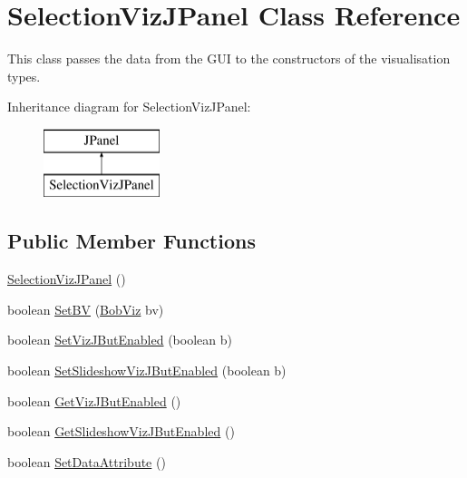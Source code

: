 \hypertarget{class_selection_viz_j_panel}{\section{Selection\-Viz\-J\-Panel Class Reference}
\label{class_selection_viz_j_panel}
}


This class passes the data from the G\-U\-I to the constructors of the visualisation types.  


Inheritance diagram for Selection\-Viz\-J\-Panel\-:\begin{figure}[H]
\begin{center}
\leavevmode
\includegraphics[height=2.000000cm]{class_selection_viz_j_panel}
\end{center}
\end{figure}
\subsection*{Public Member Functions}
\begin{DoxyCompactItemize}
\item 
\hyperlink{class_selection_viz_j_panel_ab3acb1051321159e8cfcc251b6adeb9a}{Selection\-Viz\-J\-Panel} ()
\item 
boolean \hyperlink{class_selection_viz_j_panel_a6287ea60b41d461f06b609340d9c38b4}{Set\-B\-V} (\hyperlink{class_bob_viz}{Bob\-Viz} bv)
\item 
boolean \hyperlink{class_selection_viz_j_panel_ab942f7a1e094e8d3df0df172499c8878}{Set\-Viz\-J\-But\-Enabled} (boolean b)
\item 
boolean \hyperlink{class_selection_viz_j_panel_afe28337fc26eb95b02450f6138977c90}{Set\-Slideshow\-Viz\-J\-But\-Enabled} (boolean b)
\item 
boolean \hyperlink{class_selection_viz_j_panel_ad60f302412430e0e86fe1a6dc9e65d2a}{Get\-Viz\-J\-But\-Enabled} ()
\item 
boolean \hyperlink{class_selection_viz_j_panel_ad585ffba9965244bfe10ce138cc1e3f7}{Get\-Slideshow\-Viz\-J\-But\-Enabled} ()
\item 
boolean \hyperlink{class_selection_viz_j_panel_af9db99d82813968723871bb63985618f}{Set\-Data\-Attribute} ()
\end{DoxyCompactItemize}



